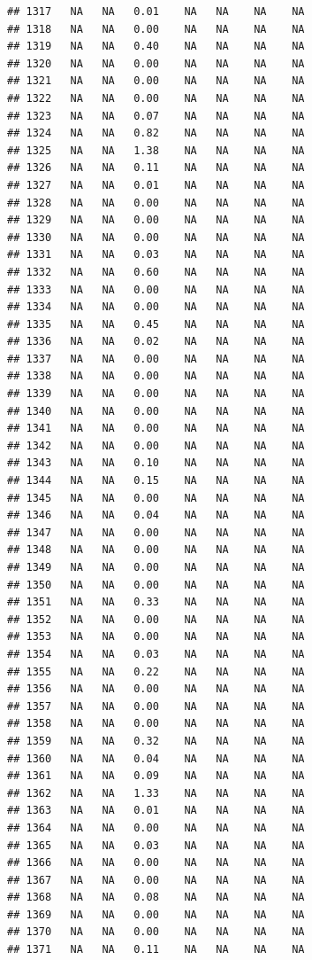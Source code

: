 \documentclass{article}\usepackage{graphicx, color}
\makeatletter
\newenvironment{kframe}{%
 \def\at@end@of@kframe{}%
 \ifinner\ifhmode%
  \def\at@end@of@kframe{\end{minipage}}%
  \begin{minipage}{\columnwidth}%
 \fi\fi%
 \def\FrameCommand##1{\hskip\@totalleftmargin \hskip-\fboxsep
 \colorbox{shadecolor}{##1}\hskip-\fboxsep
     \hskip-\linewidth \hskip-\@totalleftmargin \hskip\columnwidth}%
 \MakeFramed {\advance\hsize-\width
   \@totalleftmargin\z@ \linewidth\hsize
   \@setminipage}}%
 {\par\unskip\endMakeFramed%
 \at@end@of@kframe}
\newenvironment{knitrout}{}{} %
\makeatother
\begin{document}
\begin{knitrout}
\begin{kframe}
\begin{verbatim}
## 1317   NA   NA   0.01    NA   NA    NA    NA
## 1318   NA   NA   0.00    NA   NA    NA    NA
## 1319   NA   NA   0.40    NA   NA    NA    NA
## 1320   NA   NA   0.00    NA   NA    NA    NA
## 1321   NA   NA   0.00    NA   NA    NA    NA
## 1322   NA   NA   0.00    NA   NA    NA    NA
## 1323   NA   NA   0.07    NA   NA    NA    NA
## 1324   NA   NA   0.82    NA   NA    NA    NA
## 1325   NA   NA   1.38    NA   NA    NA    NA
## 1326   NA   NA   0.11    NA   NA    NA    NA
## 1327   NA   NA   0.01    NA   NA    NA    NA
## 1328   NA   NA   0.00    NA   NA    NA    NA
## 1329   NA   NA   0.00    NA   NA    NA    NA
## 1330   NA   NA   0.00    NA   NA    NA    NA
## 1331   NA   NA   0.03    NA   NA    NA    NA
## 1332   NA   NA   0.60    NA   NA    NA    NA
## 1333   NA   NA   0.00    NA   NA    NA    NA
## 1334   NA   NA   0.00    NA   NA    NA    NA
## 1335   NA   NA   0.45    NA   NA    NA    NA
## 1336   NA   NA   0.02    NA   NA    NA    NA
## 1337   NA   NA   0.00    NA   NA    NA    NA
## 1338   NA   NA   0.00    NA   NA    NA    NA
## 1339   NA   NA   0.00    NA   NA    NA    NA
## 1340   NA   NA   0.00    NA   NA    NA    NA
## 1341   NA   NA   0.00    NA   NA    NA    NA
## 1342   NA   NA   0.00    NA   NA    NA    NA
## 1343   NA   NA   0.10    NA   NA    NA    NA
## 1344   NA   NA   0.15    NA   NA    NA    NA
## 1345   NA   NA   0.00    NA   NA    NA    NA
## 1346   NA   NA   0.04    NA   NA    NA    NA
## 1347   NA   NA   0.00    NA   NA    NA    NA
## 1348   NA   NA   0.00    NA   NA    NA    NA
## 1349   NA   NA   0.00    NA   NA    NA    NA
## 1350   NA   NA   0.00    NA   NA    NA    NA
## 1351   NA   NA   0.33    NA   NA    NA    NA
## 1352   NA   NA   0.00    NA   NA    NA    NA
## 1353   NA   NA   0.00    NA   NA    NA    NA
## 1354   NA   NA   0.03    NA   NA    NA    NA
## 1355   NA   NA   0.22    NA   NA    NA    NA
## 1356   NA   NA   0.00    NA   NA    NA    NA
## 1357   NA   NA   0.00    NA   NA    NA    NA
## 1358   NA   NA   0.00    NA   NA    NA    NA
## 1359   NA   NA   0.32    NA   NA    NA    NA
## 1360   NA   NA   0.04    NA   NA    NA    NA
## 1361   NA   NA   0.09    NA   NA    NA    NA
## 1362   NA   NA   1.33    NA   NA    NA    NA
## 1363   NA   NA   0.01    NA   NA    NA    NA
## 1364   NA   NA   0.00    NA   NA    NA    NA
## 1365   NA   NA   0.03    NA   NA    NA    NA
## 1366   NA   NA   0.00    NA   NA    NA    NA
## 1367   NA   NA   0.00    NA   NA    NA    NA
## 1368   NA   NA   0.08    NA   NA    NA    NA
## 1369   NA   NA   0.00    NA   NA    NA    NA
## 1370   NA   NA   0.00    NA   NA    NA    NA
## 1371   NA   NA   0.11    NA   NA    NA    NA

\end{verbatim}
\end{kframe}
\end{knitrout}
\end{document}
